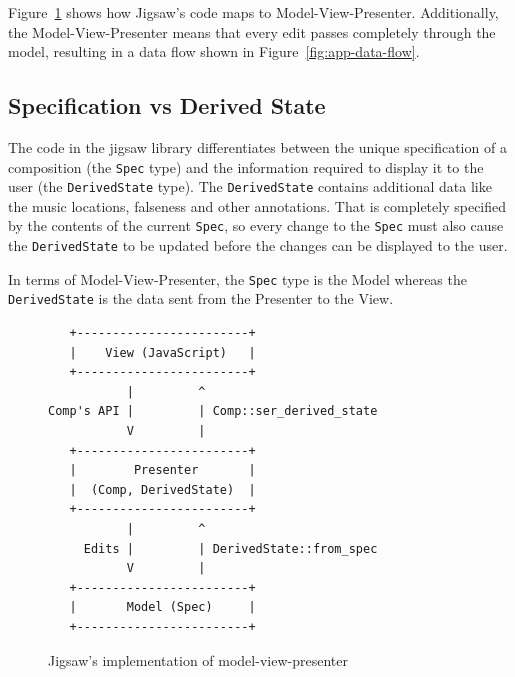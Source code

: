 \documentclass[12pt]{article}
\begin{document}
Figure~\ref{fig:model-view-presenter} shows how Jigsaw's code maps to Model-View-Presenter.
Additionally, the Model-View-Presenter means that every edit passes completely through the model,
resulting in a data flow shown in Figure~\ref{fig:app-data-flow}.

\subsection{Specification vs Derived State}

The code in the jigsaw library differentiates between the unique specification of a composition
(the \verb|Spec| type) and the information required to display it to the user (the
\verb|DerivedState| type).  The \verb|DerivedState| contains additional data like the music
locations, falseness and other annotations.  That is completely specified by the contents of the
current \verb|Spec|, so every change to the \verb|Spec| must also cause the \verb|DerivedState| to
be updated before the changes can be displayed to the user.

In terms of Model-View-Presenter, the \verb|Spec| type is the Model whereas the \verb|DerivedState|
is the data sent from the Presenter to the View.

\begin{figure}
    \centering
    \begin{BVerbatim}
   +------------------------+
   |    View (JavaScript)   |
   +------------------------+
           |         ^
Comp's API |         | Comp::ser_derived_state
           V         |
   +------------------------+
   |        Presenter       |
   |  (Comp, DerivedState)  |
   +------------------------+
           |         ^
     Edits |         | DerivedState::from_spec
           V         |
   +------------------------+
   |       Model (Spec)     |
   +------------------------+
    \end{BVerbatim}
    \caption{Jigsaw's implementation of model-view-presenter}\label{fig:model-view-presenter}
\end{figure}
\end{document}
